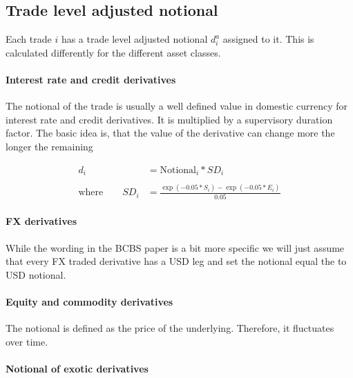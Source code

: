 \documentclass[11pt]{article}
\begin{document}
    \hypertarget{trade-level-adjusted-notional}{%
\subsection{Trade level adjusted
notional}\label{trade-level-adjusted-notional}}

Each trade \(i\) has a trade level adjusted notional \(d_i^a\) assigned
to it. This is calculated differently for the different asset classes.

\hypertarget{interest-rate-and-credit-derivatives}{%
\paragraph{Interest rate and credit
derivatives}\label{interest-rate-and-credit-derivatives}}

The notional of the trade is usually a well defined value in domestic
currency for interest rate and credit derivatives. It is multiplied by a
supervisory duration factor. The basic idea is, that the value of the
derivative can change more the longer the remaining

\begin{align*}
d_i &= \text{Notional}_i * SD_i \\
\\
\text{where} \qquad SD_i &=\frac{\exp\left(-0.05 * S_i\right)-\exp\left(-0.05 * E_i\right)}{0.05}
\end{align*}

\hypertarget{fx-derivatives}{%
\paragraph{FX derivatives}\label{fx-derivatives}}

While the wording in the BCBS paper is a bit more specific we will just
assume that every FX traded derivative has a USD leg and set the
notional equal the to USD notional.

\hypertarget{equity-and-commodity-derivatives}{%
\paragraph{Equity and commodity
derivatives}\label{equity-and-commodity-derivatives}}

The notional is defined as the price of the underlying. Therefore, it
fluctuates over time.

\hypertarget{notional-of-exotic-derivatives}{%
\paragraph{Notional of exotic
derivatives}\label{notional-of-exotic-derivatives}}
\end{document}
